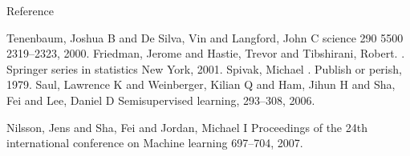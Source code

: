 \documentclass[xcolor={dvipsnames,table}]{beamer}
\begin{document}
\begin{frame}{Reference}

\begin{thebibliography}{10} 
	\fontsize{1pt}{1}\selectfont 
	 \beamertemplatearticlebibitems
    Tenenbaum, Joshua B and De Silva, Vin and Langford, John C
    \newblock science 290 5500 2319--2323, 2000. 
  \beamertemplatebookbibitems
    Friedman, Jerome and Hastie, Trevor and Tibshirani, Robert.
    .
    \newblock Springer series in statistics New York, 2001.
  \beamertemplatebookbibitems
    Spivak, Michael
    .
    \newblock Publish or perish, 1979.
  \beamertemplatearticlebibitems
    Saul, Lawrence K and Weinberger, Kilian Q and Ham, Jihun H and Sha, Fei and Lee, Daniel D
    \newblock Semisupervised learning, 293--308, 2006.
 
  \beamertemplatearticlebibitems
    Nilsson, Jens and Sha, Fei and Jordan, Michael I
    \newblock Proceedings of the 24th international conference on Machine learning 697--704, 2007.
  \end{thebibliography}

\end{frame}
\end{document}
